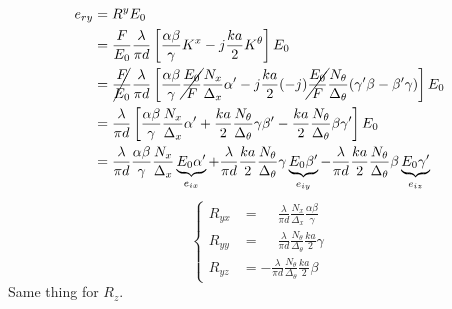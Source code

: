 \begin{align*}
    e_{ry}
    &= R^y E_0
    \\
    &= \frac{F}{E_0}
       \frac{\lambda}{\pi d}
       \left[
           \frac{\alpha \beta}{\gamma}
           K^x
           -
           j
           \frac{ka}{2}
           K^\theta           
       \right]
       E_0
    \\
    &= \cancel{\frac{F}{E_0}}
       \frac{\lambda}{\pi d}
       \left[
           \frac{\alpha \beta}{\gamma}
           \cancel{\frac{E_0}{F}}
           \frac{N_x}{\Delta_x}
           \alpha'
           -
           j
           \frac{ka}{2}
           (-j)
           \cancel{\frac{E_0}{F}}
           \frac{N_\theta}{\Delta_\theta}
           (\gamma' \beta - \beta' \gamma)           
       \right]
       E_0
    \\
    &= \frac{\lambda}{\pi d}
       \left[
           \frac{\alpha \beta}{\gamma}
           \frac{N_x}{\Delta_x}
           \alpha'
           +
           \frac{ka}{2}
           \frac{N_\theta}{\Delta_\theta}
           \gamma
           \beta'
           -
           \frac{ka}{2}
           \frac{N_\theta}{\Delta_\theta}
           \beta
           \gamma'
       \right]
       E_0
    \\
    &= \frac{\lambda}{\pi d}
       \frac{\alpha \beta}{\gamma}
       \frac{N_x}{\Delta_x}
       \underbrace{E_0 \alpha'}_{e_{ix}}
       +
       \frac{\lambda}{\pi d}
       \frac{ka}{2}
       \frac{N_\theta}{\Delta_\theta}
       \gamma
       \underbrace{E_0 \beta'}_{e_{iy}}
       -
       \frac{\lambda}{\pi d}
       \frac{ka}{2}
       \frac{N_\theta}{\Delta_\theta}
       \beta
       \underbrace{E_0 \gamma'}_{e_{iz}}
\end{align*}
\begin{equation}
    \left\lbrace
    \begin{aligned}
        R_{yx}
        &=
        \phantom{-}
        \frac{\lambda}{\pi d}
        \frac{N_x}{\Delta_x}
        \frac{\alpha \beta}{\gamma}
        \\
        R_{yy}
        &=
        \phantom{-}
        \frac{\lambda}{\pi d}
        \frac{N_\theta}{\Delta_\theta}
        \frac{ka}{2}
        \gamma
        \\
        R_{yz}
        &=
        -
        \frac{\lambda}{\pi d}
        \frac{N_\theta}{\Delta_\theta}
        \frac{ka}{2}
        \beta
    \end{aligned}
    \right.
\end{equation}
Same thing for $R_z$.
